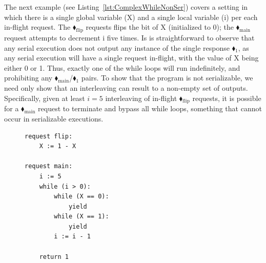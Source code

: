 The next example (see Listing~\ref{lst:ComplexWhileNonSer}) covers a setting in which there is a single global variable (X) and a single local variable (i) per each in-flight request. The {\color{ForestGreen}$\blacklozenge_\text{flip}$} requests flips the bit of  X (initialized to 0); the {\color{ForestGreen}$\blacklozenge_\text{main}$} request attempts to decrement i five times.
%
%
Is is straightforward to observe that any serial execution does not output any instance of the single response {\color{red}$\blacklozenge_1$}, 
as any serial execution will have a single request in-flight, with the value of X being either 0 or 1. Thus, exactly one of the while loops will run indefinitely, and prohibiting any {\color{ForestGreen}$\blacklozenge_\text{main}$}/{\color{red}$\blacklozenge_1$} pairs.
%
%
To show that the program is not serializable, we need only show that an interleaving can result to a non-empty set of outputs. 
%
%
Specifically, given at least $i=5$ interleaving of in-flight {\color{ForestGreen}$\blacklozenge_\text{flip}$} requests, it is possible for a {\color{ForestGreen}$\blacklozenge_\text{main}$} request to terminate and bypass all while loops, something that cannot occur in serializable executions.
%

\vspace{1em}  
\begin{figure}
	  \vspace{-1em}  %
	\centering
	\begin{lstlisting}[caption={Not serializable},label={lst:ComplexWhileNonSer},numbers=none]
request flip: 
    X := 1 - X 

request main:
    i := 5
    while (i > 0):
        while (X == 0):
            yield
        while (X == 1):
            yield
        i := i - 1

    return 1        
	\end{lstlisting}
\vspace{-0.5em}  %
\end{figure}
\vspace{1em}  %

